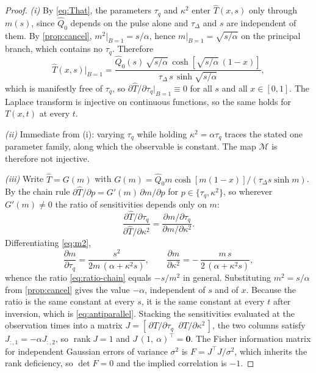 \documentclass[preprint,12pt,a4paper]{elsarticle}
\theoremstyle{plain}
\theoremstyle{definition}
\theoremstyle{remark}
\newcommand{\tq}{\tau_{q}}
\newcommand{\kk}{\kappa^{2}}
\newcommand{\Bnum}{B}
\begin{document}
\begin{proof}
\emph{(i)} By \eqref{eq:That}, the parameters $\tq$ and $\kk$ enter
$\hat{T}(x,s)$ only through $m(s)$, since $\hat{Q}_{0}$ depends on the pulse
alone and $\tau_{\Delta}$ and $s$ are independent of them. By
\cref{prop:cancel}, $m^{2}|_{\Bnum=1} = s/\alpha$, hence
$m|_{\Bnum=1} = \sqrt{s/\alpha}$ on the principal branch, which contains no
$\tq$. Therefore
%
\begin{equation}
  \hat{T}(x,s)\big|_{\Bnum=1}
  = \frac{\hat{Q}_{0}(s)\,\sqrt{s/\alpha}\,
          \cosh\!\left[\sqrt{s/\alpha}\,(1-x)\right]}
         {\tau_{\Delta}\, s\, \sinh\!\sqrt{s/\alpha}} ,
  \label{eq:That-resonance}
\end{equation}
%
which is manifestly free of $\tq$, so
$\partial \hat{T}/\partial \tq |_{\Bnum=1} \equiv 0$ for all $s$ and all
$x\in[0,1]$. The Laplace transform is injective on continuous functions, so
the same holds for $T(x,t)$ at every $t$.

\emph{(ii)} Immediate from (i): varying $\tq$ while holding
$\kk = \alpha\tq$ traces the stated one parameter family, along which the
observable is constant. The map $\mathcal{M}$ is therefore not injective.

\emph{(iii)} Write $\hat{T} = G(m)$ with
$G(m) = \hat{Q}_{0} m \cosh[m(1-x)]/(\tau_{\Delta} s \sinh m)$. By the chain
rule $\partial \hat{T}/\partial p = G'(m)\,\partial m/\partial p$ for
$p \in \{\tq, \kk\}$, so wherever $G'(m) \neq 0$ the ratio of sensitivities
depends only on $m$:
%
\begin{equation}
  \frac{\partial \hat{T}/\partial \tq}
       {\partial \hat{T}/\partial \kk}
  = \frac{\partial m/\partial \tq}{\partial m/\partial \kk} .
  \label{eq:ratio-chain}
\end{equation}
%
Differentiating \eqref{eq:m2},
%
\begin{equation}
  \frac{\partial m}{\partial \tq} = \frac{s^{2}}{2m\,(\alpha + \kk s)} ,
  \qquad
  \frac{\partial m}{\partial \kk} = -\,\frac{m\,s}{2\,(\alpha + \kk s)} ,
  \label{eq:dm}
\end{equation}
%
whence the ratio \eqref{eq:ratio-chain} equals $-s/m^{2}$ in general.
Substituting $m^{2} = s/\alpha$ from \cref{prop:cancel} gives the value
$-\alpha$, independent of $s$ and of $x$. Because the ratio is the same
constant at every $s$, it is the same constant at every $t$ after inversion,
which is \eqref{eq:antiparallel}. Stacking the sensitivities evaluated at the
observation times into a matrix
$J = [\,\partial T/\partial \tq \;\; \partial T/\partial \kk\,]$, the two
columns satisfy $J_{:,1} = -\alpha J_{:,2}$, so $\operatorname{rank} J = 1$ and
$J\,(1,\ \alpha)^{\!\top} = \bm{0}$. The Fisher information matrix for
independent Gaussian errors of variance $\sigma^{2}$ is
$F = J^{\!\top} J/\sigma^{2}$, which inherits the rank deficiency, so
$\det F = 0$ and the implied correlation is $-1$.
\end{proof}
\end{document}
